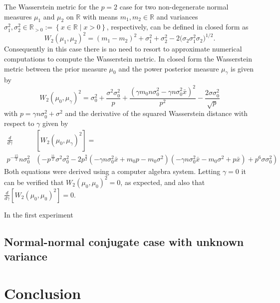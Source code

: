 \documentclass{article}
\begin{document}
The Wasserstein metric for the $p = 2$ case for two non-degenerate normal measures $\mu_1$ and $\mu_2$ on $\mathbb{R}$ with means $m_1, m_2 \in \mathbb{R}$ and variances $\sigma_1^2, \sigma_2^2 \in \mathbb{R}_{>0} := \left\lbrace x \in \mathbb{R} \; | \; x > 0 \right\rbrace$, respectively, can be defined in closed form as
\begin{equation}
W_{2} (\mu_1, \mu_2)^2 = \left( m_1 - m_2 \right)^2 + \sigma_1^2 + \sigma_2^2 - 2 \bigl( \sigma_2 \sigma_1^2 \sigma_2 \bigr)^{1/2}.
\end{equation}
Consequently in this case there is no need to resort to approximate numerical computations to compute the Wasserstein metric. In closed form the Wasserstein metric between the prior measure $\mu_0$ and the power posterior measure $\mu_\gamma$ is given by
\begin{equation}
W_2(\mu_0, \mu_\gamma)^2 = \sigma_{0}^{2} + \frac{\sigma^{2} \sigma_{0}^{2}}{p} + \frac{\left(\gamma m_{0} n \sigma_{0}^{2} - \gamma n \sigma_{0}^{2} \bar{x}\right)^{2}}{p^{2}} - \frac{2 \sigma \sigma_{0}^{2}}{\sqrt{p}}
\end{equation}
with $p = \gamma n \sigma_{0}^{2} + \sigma^{2}$ and the derivative of the squared Wasserstein distance with respect to $\gamma$ given by
\begin{equation}
\begin{split}
\frac{d}{d\gamma} &[W_2(\mu_0, \mu_\gamma)^2] = \\
p^{-\frac{15}{2}}n \sigma_{0}^{2} &\left(- p^{\frac{11}{2}} \sigma^{2} \sigma_{0}^{2} - 2 p^{\frac{9}{2}} \left(- \gamma n \sigma_{0}^{2} \bar{x} + m_{0} p - m_{0} \sigma^{2}\right) \left(- \gamma n \sigma_{0}^{2} \bar{x} - m_{0} \sigma^{2} + p \bar{x}\right) + p^{6} \sigma \sigma_{0}^{2}\right)
\end{split}
\end{equation}
Both equations were derived using a computer algebra system. Letting $\gamma = 0$ it can be verified that $W_2(\mu_0, \mu_0)^2 = 0$, as expected, and also that $\frac{d}{d\gamma}[W_2(\mu_0, \mu_0)^2] = 0$. 

In the first experiment 

\subsection{Normal-normal conjugate case with unknown variance}

\section{Conclusion}
\end{document}
